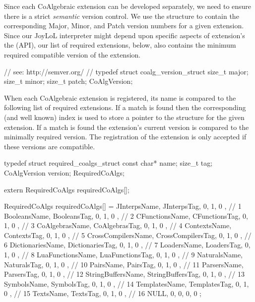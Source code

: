 Since each CoAlgebraic extension can be developed separately, we need to 
ensure there is a strict \emph{semantic} version control. We use the 
 structure to contain the corresponding Major, Minor, 
and Patch version numbers for a given extension. Since our JoyLoL 
interpreter might depend upon specific aspects of extension's the 
 (API), our list of required 
extensions, below, also contains the minimum required compatible version 
of the extension. 

\startCHeader
// see: http://semver.org/
//
typedef struct coalg_version_struct {
  size_t major;
  size_t minor;
  size_t patch;
} CoAlgVersion;
\stopCHeader

When each CoAlgebraic extension is registered, its name is compared to the 
following list of required extensions. If a match is found then the 
corresponding (and well known) index is used to store a pointer to the 
 structure for the given extension. If a match is found 
the extension's current version is compared to the minimally required 
version. The registration of the extension is only accepted if these 
versions are compatible. 

\startCHeader
typedef struct required_coalgs_struct {
  const char*  name;
  size_t       tag;
  CoAlgVersion version;
} RequiredCoAlgs;

extern RequiredCoAlgs requiredCoAlgs[];
\stopCHeader
{}

\startCCode
RequiredCoAlgs requiredCoAlgs[] = {
  { JInterpsName,       JInterpsTag,       {0, 1, 0 }}, //  1
  { BooleansName,       BooleansTag,       {0, 1, 0 }}, //  2
  { CFunctionsName,     CFunctionsTag,     {0, 1, 0 }}, //  3
  { CoAlgebrasName,     CoAlgebrasTag,     {0, 1, 0 }}, //  4
  { ContextsName,       ContextsTag,       {0, 1, 0 }}, //  5
  { CrossCompilersName, CrossCompilersTag, {0, 1, 0 }}, //  6
  { DictionariesName,   DictionariesTag,   {0, 1, 0 }}, //  7
  { LoadersName,        LoadersTag,        {0, 1, 0 }}, //  8
  { LuaFunctionsName,   LuaFunctionsTag,   {0, 1, 0 }}, //  9
  { NaturalsName,       NaturalsTag,       {0, 1, 0 }}, // 10
  { PairsName,          PairsTag,          {0, 1, 0 }}, // 11
  { ParsersName,        ParsersTag,        {0, 1, 0 }}, // 12
  { StringBuffersName,  StringBuffersTag,  {0, 1, 0 }}, // 13
  { SymbolsName,        SymbolsTag,        {0, 1, 0 }}, // 14
  { TemplatesName,      TemplatesTag,      {0, 1, 0 }}, // 15
  { TextsName,          TextsTag,          {0, 1, 0 }}, // 16
  { NULL,               0,                 {0, 0, 0 }}
};
\stopCCode

